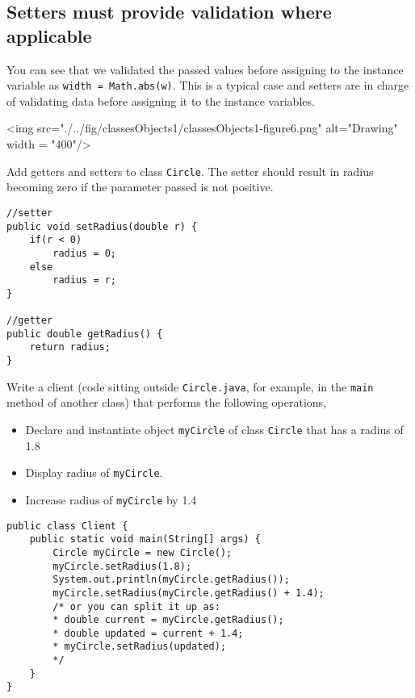 

\subsection{Setters must provide validation where applicable}

You can see that we validated the passed values before assigning to the instance variable as
	\texttt{width = Math.abs(w)}. This is a typical case and setters are in charge of validating data before assigning it to the instance variables. 	

\vskip 0.1cm
\begin{center}
		<img src="./../fig/classesObjects1/classesObjects1-figure6.png" alt="Drawing" width = "400"/> 	
\end{center}
\vskip 0.1cm

\begin{exercise}
Add getters and setters to class \texttt{Circle}. The setter should result in radius becoming zero if the parameter passed is not positive.
\end{exercise}
\begin{answer} \begin{lstlisting}
//setter
public void setRadius(double r) {
	if(r < 0)
		radius = 0;
	else
		radius = r;
}

//getter
public double getRadius() {
	return radius;
}
\end{lstlisting} \end{answer}

\begin{exercise}
Write a client (code sitting outside \texttt{Circle.java}, for example, in the \texttt{main} method of another class) that performs the following operations,

\begin{itemize}
\item Declare and instantiate object \texttt{myCircle} of class \texttt{Circle} that has a radius of 1.8
\item Display radius of \texttt{myCircle}.
\item Increase radius of \texttt{myCircle} by 1.4
\end{itemize}
\end{exercise}
\begin{answer} \begin{lstlisting}
public class Client {
	public static void main(String[] args) {
		Circle myCircle = new Circle();
		myCircle.setRadius(1.8);
		System.out.println(myCircle.getRadius());
		myCircle.setRadius(myCircle.getRadius() + 1.4);
		/* or you can split it up as:
		* double current = myCircle.getRadius();
		* double updated = current + 1.4;
		* myCircle.setRadius(updated);
		*/
	}
}
\end{lstlisting} \end{answer}

